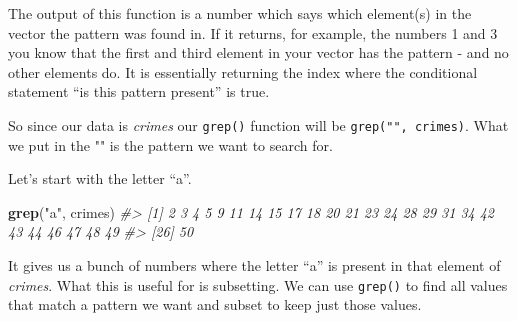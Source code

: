 \documentclass[
  12pt,
]{book}
\newenvironment{Shaded}{\begin{snugshade}}{\end{snugshade}}
\newcommand{\CommentTok}[1]{\textcolor[rgb]{0.37,0.37,0.37}{\textit{#1}}}
\newcommand{\KeywordTok}[1]{\textcolor[rgb]{0.27,0.27,0.27}{\textbf{#1}}}
\newcommand{\NormalTok}[1]{#1}
\newcommand{\StringTok}[1]{\textcolor[rgb]{0.5,0.5,0.5}{#1}}
\begin{document}
The output of this function is a number which says which element(s) in the vector the pattern was found in. If it returns, for example, the numbers 1 and 3 you know that the first and third element in your vector has the pattern - and no other elements do. It is essentially returning the index where the conditional statement ``is this pattern present'' is true.

So since our data is \emph{crimes} our \texttt{grep()} function will be \texttt{grep("",\ crimes)}. What we put in the "" is the pattern we want to search for.

Let's start with the letter ``a''.

\begin{Shaded}
\begin{Highlighting}[]
\KeywordTok{grep}\NormalTok{(}\StringTok{"a"}\NormalTok{, crimes)}
\CommentTok{\#>  [1]  2  3  4  5  9 11 14 15 17 18 20 21 23 24 28 29 31 34 42 43 44 46 47 48 49}
\CommentTok{\#> [26] 50}
\end{Highlighting}
\end{Shaded}

It gives us a bunch of numbers where the letter ``a'' is present in that element of \emph{crimes}. What this is useful for is subsetting. We can use \texttt{grep()} to find all values that match a pattern we want and subset to keep just those values.
\end{document}

